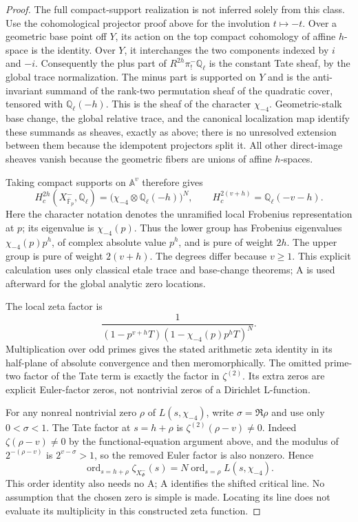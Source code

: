 \begin{proof}
The full compact-support realization is not inferred solely from this class. Use the cohomological projector proof above for the involution $t\mapsto-t$. Over a geometric base point off $Y$, its action on the top compact cohomology of affine $h$-space is the identity. Over $Y$, it interchanges the two components indexed by $i$ and $-i$. Consequently the plus part of $R^{2h}\pi^-_!\mathbb Q_\ell$ is the constant Tate sheaf, by the global trace normalization. The minus part is supported on $Y$ and is the anti-invariant summand of the rank-two permutation sheaf of the quadratic cover, tensored with $\mathbb Q_\ell(-h)$. This is the sheaf of the character $\chi_{-4}$. Geometric-stalk base change, the global relative trace, and the canonical localization map identify these summands as sheaves, exactly as above; there is no unresolved extension between them because the idempotent projectors split it. All other direct-image sheaves vanish because the geometric fibers are unions of affine $h$-spaces.

Taking compact supports on $\mathbb A^v$ therefore gives
\[
 H_c^{2h}(X^-_{\overline{\mathbb F}_p},\mathbb Q_\ell)
       =\bigl(\chi_{-4}\otimes\mathbb Q_\ell(-h)\bigr)^N,
 \qquad
 H_c^{2(v+h)}=\mathbb Q_\ell(-v-h).
\]
Here the character notation denotes the unramified local Frobenius representation at $p$; its eigenvalue is $\chi_{-4}(p)$. Thus the lower group has Frobenius eigenvalues $\chi_{-4}(p)p^h$, of complex absolute value $p^h$, and is pure of weight $2h$. The upper group is pure of weight $2(v+h)$. The degrees differ because $v\geq1$. This explicit calculation uses only classical etale trace and base-change theorems; A is used afterward for the global analytic zero locations.

The local zeta factor is
\[
 \frac{1}{(1-p^{v+h}T)(1-\chi_{-4}(p)p^hT)^N}.
\]
Multiplication over odd primes gives the stated arithmetic zeta identity in its half-plane of absolute convergence and then meromorphically. The omitted prime-two factor of the Tate term is exactly the factor in $\zeta^{(2)}$. Its extra zeros are explicit Euler-factor zeros, not nontrivial zeros of a Dirichlet L-function.

For any nonreal nontrivial zero $\rho$ of $L(s,\chi_{-4})$, write $\sigma=\Re\rho$ and use only $0<\sigma<1$. The Tate factor at $s=h+\rho$ is $\zeta^{(2)}(\rho-v)\ne0$. Indeed $\zeta(\rho-v)\ne0$ by the functional-equation argument above, and the modulus of $2^{-(\rho-v)}$ is $2^{v-\sigma}>1$, so the removed Euler factor is also nonzero. Hence
\[
 \operatorname{ord}_{s=h+\rho}\zeta_{X^-_\Phi}(s)
              =N\operatorname{ord}_{s=\rho}L(s,\chi_{-4}).
\]
This order identity also needs no A; A identifies the shifted critical line. No assumption that the chosen zero is simple is made. Locating its line does not evaluate its multiplicity in this constructed zeta function.


\end{proof}

